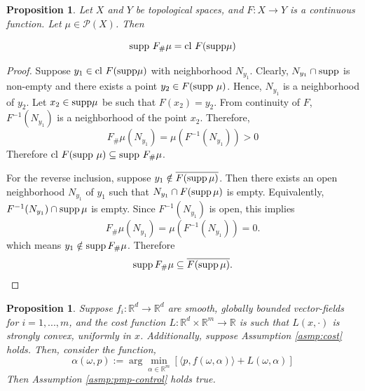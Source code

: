 \documentclass{article}
\newtheorem{proposition}[theorem]{Proposition}
\begin{document}
\begin{proposition}
\label{prop:supp}
Let $X$ and $Y$ be topological spaces, and $F: X \rightarrow Y$ is a continuous function. Let $\mu \in \mathcal{P}(X)$. Then  

\begin{equation}
{\rm  supp} ~ F_{\#} \mu = {\rm cl}~F({\rm  supp} \mu)
\end{equation}
\end{proposition}
\begin{proof}
Suppose  $y_1 \in {\rm cl}~F({\rm  supp} \mu)$ with neighborhood $N_{y_1}$. Clearly, $N_{y_1} \cap {\rm  supp}$ is non-empty and there exists a point $y_2 \in F({\rm  supp} ~\mu)$. Hence, $N_{y_1}$ is a neighborhood of $y_2$. Let $x_2 \in {\rm  supp} \mu$ be such that $F(x_2) = y_2$. From continuity of $F$, $F^{-1} (N_{y_1})$ is a neighborhood of the point $x_2$. Therefore,
\[
F_{\#}\mu(N_{y_1}) = \mu\!\left(F^{-1}(N_{y_1})\right) > 0
\]
Therefore ${\rm cl}~F({\rm  supp}~ \mu) \subseteq {\rm  supp} ~ F_{\#} \mu$. 

For the reverse inclusion, suppose $y_1 \notin \overline{F({\rm supp}\,\mu)}$. 
Then there exists an open neighborhood $N_{y_1}$ of $y_1$ such that $
N_{y_1} \cap F({\rm supp}\,\mu)$ is empty.
Equivalently, $F^{-1}(N_{y_1}) \cap {\rm supp}\,\mu$ is empty. 
Since $F^{-1}(N_{y_1})$ is open, this implies 
\[
F_{\#}\mu(N_{y_1}) = \mu(F^{-1}(N_{y_1})) = 0.
\]
which means $y_1 \notin {\rm supp}\,F_{\#}\mu$. 
Therefore
\[
{\rm supp}\,F_{\#}\mu \subseteq \overline{F({\rm supp}\,\mu)} .
\]
\end{proof}
\begin{proposition}
    Suppose $f_i :\mathbb{R}^d \rightarrow \mathbb{R}^d$ are smooth, globally bounded vector-fields for $i =1,...,m$, and the cost function $L: \mathbb{R}^d \times \mathbb{R}^m \rightarrow \mathbb{R}$ is such that $L(x, \cdot )$ is strongly convex, uniformly in $x$. Additionally, suppose Assumption \ref{asmp:cost} holds. Then, consider the function,
    \[\alpha(\omega,p) := \arg\min_{\alpha \in \mathbb{R}^m} \left[\langle p, f(\omega,\alpha) \rangle + L(\omega,\alpha)\right]\]
    Then Assumption \ref{asmp:pmp-control} holds true.
    \label{prop:relaass}
\end{proposition}
\end{document}
